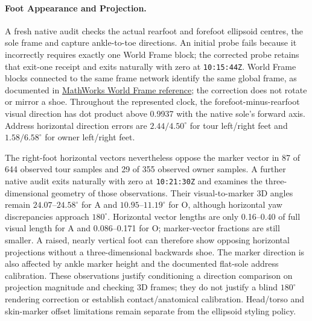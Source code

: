\documentclass[11pt,a4paper]{article}
\begin{document}
\paragraph{Foot Appearance and Projection.}
A fresh native audit checks the actual rearfoot and forefoot ellipsoid
centres, the sole frame and capture ankle-to-toe directions. An initial
probe fails because it incorrectly requires exactly one World Frame block;
the corrected probe retains that exit-one receipt and exits naturally with
zero at \texttt{10:15:44Z}. World Frame blocks connected to the same frame network identify the same
global frame, as documented in \href{https://www.mathworks.com/help/sm/ref/worldframe.html}{MathWorks World Frame reference}; the correction does not rotate or mirror a shoe. Throughout
the represented clock, the forefoot-minus-rearfoot visual direction has dot
product above 0.9937 with the native sole's forward axis. Address horizontal
direction errors are \(2.44/4.50^{\circ}\) for tour left/right feet and
\(1.58/6.58^{\circ}\) for owner left/right feet.

The right-foot horizontal vectors nevertheless oppose the marker vector in
87 of 644 observed tour samples and 29 of 355 observed owner samples.
A further native audit exits naturally with zero at \texttt{10:21:30Z}
and examines the three-dimensional geometry of those observations. Their
visual-to-marker 3D angles remain \(24.07\)--\(24.58^{\circ}\) for A and
\(10.95\)--\(11.19^{\circ}\) for O, although horizontal yaw discrepancies
approach \(180^{\circ}\). Horizontal vector lengths are only 0.16--0.40
of full visual length for A and 0.086--0.171 for O; marker-vector fractions
are still smaller. A raised, nearly vertical foot can therefore show
opposing horizontal projections without a three-dimensional backwards shoe.
The marker direction is also affected by ankle marker height and the
documented flat-sole address calibration. These observations justify
conditioning a direction comparison on projection magnitude and checking
3D frames; they do not justify a blind \(180^{\circ}\) rendering correction
or establish contact/anatomical calibration. Head/torso and skin-marker
offset limitations remain separate from the ellipsoid styling policy.
\end{document}

